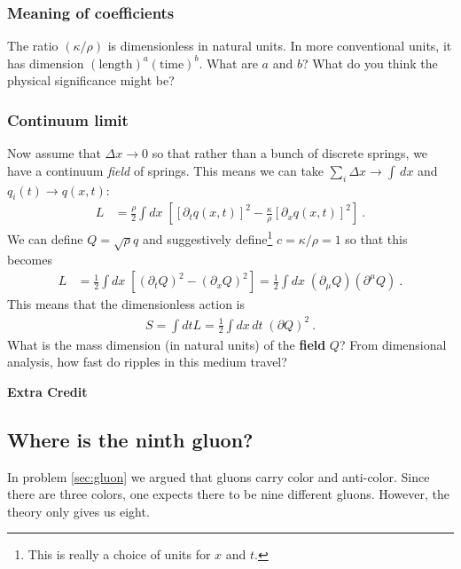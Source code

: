 \documentclass[12pt]{article}
\begin{document}
\subsubsection{Meaning of coefficients}

The ratio $(\kappa/\rho)$ is dimensionless in natural units. In more conventional units, it has dimension $(\text{length})^a(\text{time})^b$. What are $a$ and $b$? What do you think the physical significance might be?

\subsubsection{Continuum limit}

Now assume that $\Delta x \to 0$ so that rather than a bunch of discrete springs, we have a continuum \emph{field} of springs. This means we can take $\sum_i \Delta x \to \int\, dx$ and $q_i(t) \to q(x,t)$:
\begin{align}
	L &=
	\frac{\rho}{2} \int dx \;   
	\left[
	\left[\partial_t q(x,t)\right]^2
	- 
	\frac{\kappa}{\rho} \left[\partial_x q(x,t)\right]^2 
	\right] \ .
\end{align}
We can define $Q = \sqrt\rho q$ and suggestively define\footnote{This is really a choice of units for $x$ and $t$.} $c = \kappa/\rho = 1$ so that this becomes
\begin{align}
	L &=
	\frac{1}{2} \int dx \;   
	\left[
	\left(\partial_t Q\right)^2
	- 
	\left(\partial_x Q\right)^2 
	\right] 
	=
	\frac{1}{2} \int dx \;   
	(\partial_\mu Q)(\partial^\mu Q) \ .
\end{align}
This means that the dimensionless action is
\begin{align}
	S = \int dt L = \frac 12 \int dx\, dt \; (\partial Q)^2 \ .
\end{align}
What is the mass dimension (in natural units) of the \textbf{field} $Q$? From dimensional analysis, how fast do ripples in this medium travel?

\newpage

\appendix
\vspace{1em}
{\Large\textbf{Extra Credit}}

\subsection{Where is the ninth gluon?}

In problem \ref{sec:gluon} we argued that gluons carry color and anti-color. Since there are three colors, one expects there to be nine different gluons. However, the theory only gives us eight. 
\end{document}
